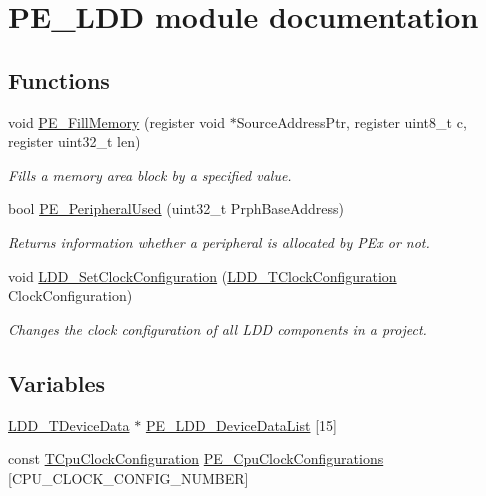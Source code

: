 \hypertarget{group___p_e___l_d_d__module}{\section{P\-E\-\_\-\-L\-D\-D module documentation}
\label{group___p_e___l_d_d__module}
}
\subsection*{Functions}
\begin{DoxyCompactItemize}
\item 
void \hyperlink{group___p_e___l_d_d__module_ga6cb22864b71fd00f200c9fb3375f4e29}{P\-E\-\_\-\-Fill\-Memory} (register void $\ast$Source\-Address\-Ptr, register uint8\-\_\-t c, register uint32\-\_\-t len)
\begin{DoxyCompactList}\small\item\em Fills a memory area block by a specified value. \end{DoxyCompactList}\item 
bool \hyperlink{group___p_e___l_d_d__module_ga9e049b01a45212fe5b6a8476fe124b59}{P\-E\-\_\-\-Peripheral\-Used} (uint32\-\_\-t Prph\-Base\-Address)
\begin{DoxyCompactList}\small\item\em Returns information whether a peripheral is allocated by P\-Ex or not. \end{DoxyCompactList}\item 
void \hyperlink{group___p_e___l_d_d__module_ga7fe8a131453ba765c5e85130a282eafb}{L\-D\-D\-\_\-\-Set\-Clock\-Configuration} (\hyperlink{group___p_e___types__module_ga369bcaf7f00caad5f994c72ac2629a37}{L\-D\-D\-\_\-\-T\-Clock\-Configuration} Clock\-Configuration)
\begin{DoxyCompactList}\small\item\em Changes the clock configuration of all L\-D\-D components in a project. \end{DoxyCompactList}\end{DoxyCompactItemize}
\subsection*{Variables}
\begin{DoxyCompactItemize}
\item 
\hyperlink{group___p_e___types__module_gac5cf1362f1f0e3a2ce71b1bf2276d091}{L\-D\-D\-\_\-\-T\-Device\-Data} $\ast$ \hyperlink{group___p_e___l_d_d__module_ga4323b74fe3deac7b812be72b488df761}{P\-E\-\_\-\-L\-D\-D\-\_\-\-Device\-Data\-List} \mbox{[}15\mbox{]}
\item 
const \hyperlink{struct_t_cpu_clock_configuration}{T\-Cpu\-Clock\-Configuration} \hyperlink{group___p_e___l_d_d__module_gab69281f0e90d16198a5595ed7f471441}{P\-E\-\_\-\-Cpu\-Clock\-Configurations} \mbox{[}C\-P\-U\-\_\-\-C\-L\-O\-C\-K\-\_\-\-C\-O\-N\-F\-I\-G\-\_\-\-N\-U\-M\-B\-E\-R\mbox{]}
\end{DoxyCompactItemize}


